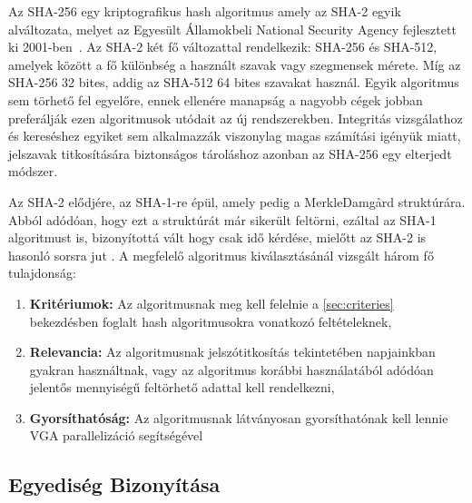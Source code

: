 Az SHA-256 egy kriptografikus hash algoritmus amely az SHA-2 egyik alváltozata, melyet az Egyesült Államokbeli National Security Agency fejlesztett ki 2001-ben~\cite{gueron2011sha}. Az SHA-2 két fő változattal rendelkezik: SHA-256 és SHA-512, amelyek között a fő különbség a használt szavak vagy szegmensek mérete. Míg az SHA-256 32 bites, addig az SHA-512 64 bites szavakat használ. Egyik algoritmus sem törhető fel egyelőre, ennek ellenére manapság a nagyobb cégek jobban preferálják ezen algoritmusok utódait az új rendszerekben. Integritás vizsgálathoz és kereséshez egyiket sem alkalmazzák viszonylag magas számítási igényük miatt, jelszavak titkosítására biztonságos tároláshoz azonban az SHA-256 egy elterjedt módszer.

Az SHA-2 elődjére, az SHA-1-re épül, amely pedig a MerkleDamgård struktúrára. Abból adódóan, hogy ezt a struktúrát már sikerült feltörni, ezáltal az SHA-1 algoritmust is, bizonyítottá vált hogy csak idő kérdése, mielőtt az SHA-2 is hasonló sorsra jut \cite{sha2017survey}.
%
A megfelelő algoritmus kiválasztásánál vizsgált három fő tulajdonság:
%
\begin{enumerate}
  \item \textbf{Kritériumok:} Az algoritmusnak meg kell felelnie a \ref{sec:criteries} bekezdésben foglalt hash algoritmusokra vonatkozó feltételeknek,
  \item \textbf{Relevancia:} Az algoritmusnak jelszótitkosítás tekintetében napjainkban gyakran használtnak, vagy az algoritmus korábbi használatából adódóan jelentős mennyiségű feltörhető adattal kell rendelkezni,
  \item \textbf{Gyorsíthatóság:} Az algoritmusnak látványosan gyorsíthatónak kell lennie VGA parallelizáció segítségével
\end{enumerate}


\subsection{Egyediség Bizonyítása}

